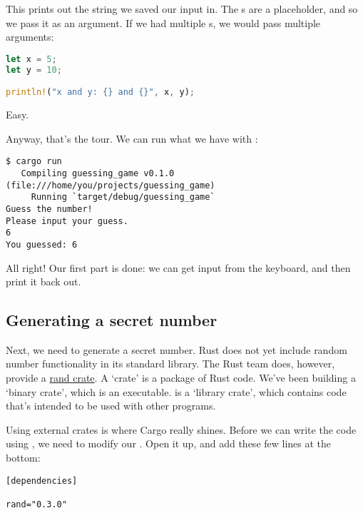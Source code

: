 This prints out the string we saved our input in. The \code{\{\}}s are a placeholder, and so we pass it  as an 
argument. If we had multiple \code{\{\}}s, we would pass multiple arguments:

\begin{lstlisting}[language=Rust]
let x = 5;
let y = 10;

println!("x and y: {} and {}", x, y);
\end{lstlisting}

Easy.

\blank

Anyway, that’s the tour. We can run what we have with :

\begin{verbatim}
$ cargo run
   Compiling guessing_game v0.1.0 (file:///home/you/projects/guessing_game)
     Running `target/debug/guessing_game`
Guess the number!
Please input your guess.
6
You guessed: 6
\end{verbatim}

All right! Our first part is done: we can get input from the keyboard, and then print it back out.

\subsection{Generating a secret number}

Next, we need to generate a secret number. Rust does not yet include random number functionality in its standard library. 
The Rust team does, however, provide a \href{https://crates.io/crates/rand}{rand crate}. A ‘crate’ is a package of Rust 
code. We’ve been building a ‘binary crate’, which is an executable.  is a ‘library crate’, which contains code 
that’s intended to be used with other programs.

\blank

Using external crates is where Cargo really shines. Before we can write the code using , we need to modify our 
. Open it up, and add these few lines at the bottom:

\begin{verbatim}
[dependencies]

rand="0.3.0"
\end{verbatim}

